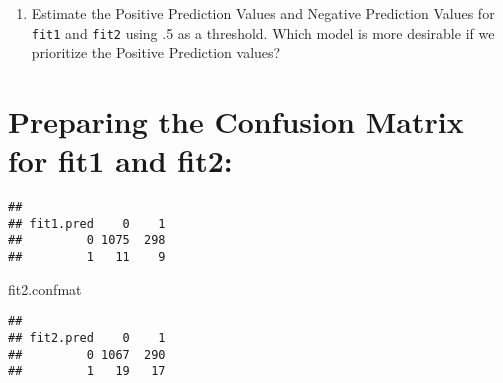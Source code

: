 \documentclass[]{article}
\newenvironment{Shaded}{\begin{snugshade}}{\end{snugshade}}
\newcommand{\KeywordTok}[1]{\textcolor[rgb]{0.13,0.29,0.53}{\textbf{#1}}}
\newcommand{\DecValTok}[1]{\textcolor[rgb]{0.00,0.00,0.81}{#1}}
\newcommand{\StringTok}[1]{\textcolor[rgb]{0.31,0.60,0.02}{#1}}
\newcommand{\OperatorTok}[1]{\textcolor[rgb]{0.81,0.36,0.00}{\textbf{#1}}}
\newcommand{\NormalTok}[1]{#1}
\providecommand{\tightlist}{%
  \setlength{\itemsep}{0pt}\setlength{\parskip}{0pt}}
\begin{document}
\begin{enumerate}
\def\labelenumi{\alph{enumi}.}
\setcounter{enumi}{2}
\tightlist
\item
  Estimate the Positive Prediction Values and Negative Prediction Values
  for \texttt{fit1} and \texttt{fit2} using .5 as a threshold. Which
  model is more desirable if we prioritize the Positive Prediction
  values?
\end{enumerate}

\section{Preparing the Confusion Matrix for fit1 and
fit2:}\label{preparing-the-confusion-matrix-for-fit1-and-fit2}

\begin{Shaded}
\end{Shaded}

\begin{verbatim}
##          
## fit1.pred    0    1
##         0 1075  298
##         1   11    9
\end{verbatim}

\begin{Shaded}
\begin{Highlighting}[]
\NormalTok{fit2.confmat}
\end{Highlighting}
\end{Shaded}

\begin{verbatim}
##          
## fit2.pred    0    1
##         0 1067  290
##         1   19   17
\end{verbatim}
\end{document}
